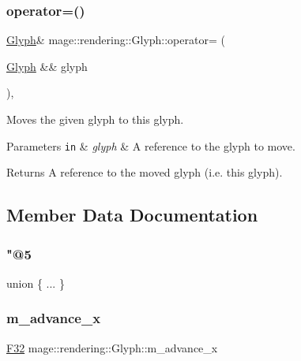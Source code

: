 \subsubsection{\texorpdfstring{operator=()}{operator=()}\hspace{0.1cm}{\footnotesize\ttfamily [2/2]}}
{\footnotesize\ttfamily \hyperlink{structmage_1_1rendering_1_1_glyph}{Glyph}\& mage\+::rendering\+::\+Glyph\+::operator= (\begin{DoxyParamCaption}\item[{\hyperlink{structmage_1_1rendering_1_1_glyph}{Glyph} \&\&}]{glyph }\end{DoxyParamCaption})\hspace{0.3cm}{\ttfamily [default]}, {\ttfamily [noexcept]}}

Moves the given glyph to this glyph.


\begin{DoxyParams}[1]{Parameters}
\mbox{\tt in}  & {\em glyph} & A reference to the glyph to move. \\
\hline
\end{DoxyParams}
\begin{DoxyReturn}{Returns}
A reference to the moved glyph (i.\+e. this glyph). 
\end{DoxyReturn}


\subsection{Member Data Documentation}
\hypertarget{structmage_1_1rendering_1_1_glyph_a760a1d2535107e86e7aa7f6633e52bd7}{}\label{structmage_1_1rendering_1_1_glyph_a760a1d2535107e86e7aa7f6633e52bd7} 
\subsubsection{\texorpdfstring{"@5}{@5}}
{\footnotesize\ttfamily union \{ ... \} }

\hypertarget{structmage_1_1rendering_1_1_glyph_ad33e119a54e94db6303a4b5dc0487700}{}\label{structmage_1_1rendering_1_1_glyph_ad33e119a54e94db6303a4b5dc0487700} 
\subsubsection{\texorpdfstring{m\+\_\+advance\+\_\+x}{m\_advance\_x}}
{\footnotesize\ttfamily \hyperlink{namespacemage_aa97e833b45f06d60a0a9c4fc22ae02c0}{F32} mage\+::rendering\+::\+Glyph\+::m\+\_\+advance\+\_\+x}

